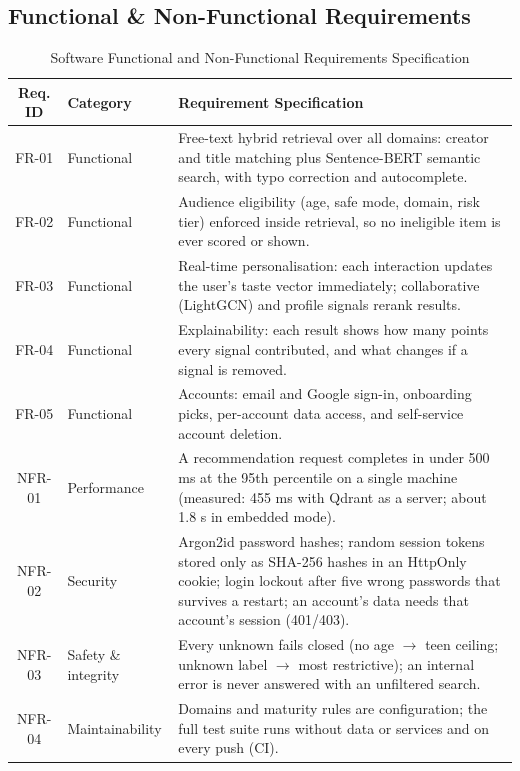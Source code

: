 \documentclass[11pt, a4paper]{article}
\begin{document}
\subsection{Functional \& Non-Functional Requirements}
\begin{table}[H]
    \centering
    \footnotesize
    \renewcommand{\arraystretch}{1.25}
    \begin{tabular}{|c|L{3.0cm}|L{9.9cm}|}
        \hline
        \textbf{Req. ID} & \textbf{Category} & \textbf{Requirement Specification} \\
        \hline
        FR-01 & Functional & Free-text hybrid retrieval over all domains: creator and title matching plus Sentence-BERT semantic search, with typo correction and autocomplete. \\
        \hline
        FR-02 & Functional & Audience eligibility (age, safe mode, domain, risk tier) enforced inside retrieval, so no ineligible item is ever scored or shown. \\
        \hline
        FR-03 & Functional & Real-time personalisation: each interaction updates the user's taste vector immediately; collaborative (LightGCN) and profile signals rerank results. \\
        \hline
        FR-04 & Functional & Explainability: each result shows how many points every signal contributed, and what changes if a signal is removed. \\
        \hline
        FR-05 & Functional & Accounts: email and Google sign-in, onboarding picks, per-account data access, and self-service account deletion. \\
        \hline
        NFR-01 & Performance & A recommendation request completes in under 500 ms at the 95th percentile on a single machine (measured: 455 ms with Qdrant as a server; about 1.8 s in embedded mode). \\
        \hline
        NFR-02 & Security & Argon2id password hashes; random session tokens stored only as SHA-256 hashes in an HttpOnly cookie; login lockout after five wrong passwords that survives a restart; an account's data needs that account's session (401/403). \\
        \hline
        NFR-03 & Safety \& integrity & Every unknown fails closed (no age $\rightarrow$ teen ceiling; unknown label $\rightarrow$ most restrictive); an internal error is never answered with an unfiltered search. \\
        \hline
        NFR-04 & Maintainability & Domains and maturity rules are configuration; the full test suite runs without data or services and on every push (CI). \\
        \hline
    \end{tabular}
    \caption{Software Functional and Non-Functional Requirements Specification}
\end{table}
\end{document}
